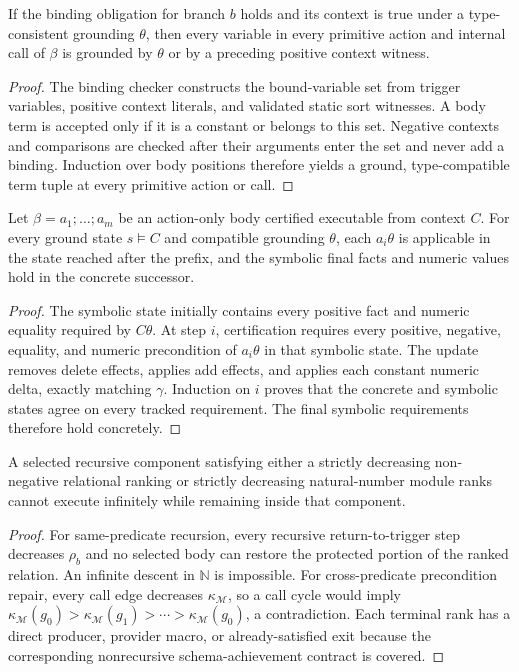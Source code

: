 \begin{lemma}
If the binding obligation for branch $b$ holds and its context is true under a
type-consistent grounding $\theta$, then every variable in every primitive
action and internal call of $\beta$ is grounded by $\theta$ or by a preceding
positive context witness.
\end{lemma}

\begin{proof}
The binding checker constructs the bound-variable set from trigger variables,
positive context literals, and validated static sort witnesses. A body term is
accepted only if it is a constant or belongs to this set. Negative contexts and
comparisons are checked after their arguments enter the set and never add a
binding. Induction over body positions therefore yields a ground, type-compatible
term tuple at every primitive action or call.
\end{proof}

\begin{lemma}
Let $\beta=a_1;\ldots;a_m$ be an action-only body certified executable from
context $C$. For every ground state $s\models C$ and compatible grounding
$\theta$, each $a_i\theta$ is applicable in the state reached after the prefix,
and the symbolic final facts and numeric values hold in the concrete successor.
\end{lemma}

\begin{proof}
The symbolic state initially contains every positive fact and numeric equality
required by $C\theta$. At step $i$, certification requires every positive,
negative, equality, and numeric precondition of $a_i\theta$ in that symbolic
state. The update removes delete effects, applies add effects, and applies each
constant numeric delta, exactly matching $\gamma$. Induction on $i$ proves that
the concrete and symbolic states agree on every tracked requirement. The final
symbolic requirements therefore hold concretely.
\end{proof}

\begin{lemma}
A selected recursive component satisfying either a strictly decreasing
non-negative relational ranking or strictly decreasing natural-number module
ranks cannot execute infinitely while remaining inside that component.
\end{lemma}

\begin{proof}
For same-predicate recursion, every recursive return-to-trigger step decreases
$\rho_b$ and no selected body can restore the protected portion of
the ranked relation. An infinite descent in $\mathbb N$ is impossible. For
cross-predicate precondition repair, every call edge decreases
$\kappa_{\mathcal M}$, so a
call cycle would imply
$\kappa_{\mathcal M}(g_0)>\kappa_{\mathcal M}(g_1)>\cdots>
\kappa_{\mathcal M}(g_0)$, a contradiction. Each
terminal rank has a direct producer, provider macro, or already-satisfied exit
because the corresponding nonrecursive schema-achievement contract is covered.
\end{proof}


